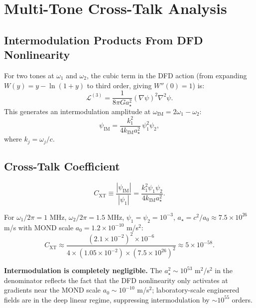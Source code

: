 \documentclass[11pt]{article}
\theoremstyle{definition}
\theoremstyle{remark}
\begin{document}
\section{Multi-Tone Cross-Talk Analysis}
\label{sec:crosstalk}

\subsection{Intermodulation Products From DFD Nonlinearity}

For two tones at $\omega_1$ and $\omega_2$, the cubic term in the DFD action
(from expanding $W(y) = y - \ln(1+y)$ to third order, giving $W''(0) = 1$) is:
\begin{equation}
  \mathcal{L}^{(3)} = \frac{1}{8\pi G a_\star^2}(\nabla\psi)^2\nabla^2\psi.
  \label{eq:L3}
\end{equation}
This generates an intermodulation amplitude at $\omega_{\mathrm{IM}} = 2\omega_1 - \omega_2$:
\begin{equation}
  \psi_{\mathrm{IM}} = \frac{k_1^2}{4k_{\mathrm{IM}} a_\star^2}\,\psi_1^2\psi_2,
  \label{eq:IM-amp}
\end{equation}
where $k_j = \omega_j/c$.

\subsection{Cross-Talk Coefficient}

\begin{equation}
  \boxed{
  C_{\mathrm{XT}} \equiv \frac{|\psi_{\mathrm{IM}}|}{|\psi_1|}
  = \frac{k_1^2\psi_1\psi_2}{4k_{\mathrm{IM}}a_\star^2}.
  } \label{eq:XT-coeff}
\end{equation}

For $\omega_1/2\pi = 1$ MHz, $\omega_2/2\pi = 1.5$ MHz, $\psi_1 = \psi_2 = 10^{-3}$,
$a_\star = c^2/a_0 \approx 7.5\times10^{26}$ m/s with MOND scale
$a_0 = 1.2\times10^{-10}$ m/s$^2$:
\begin{equation}
  C_{\mathrm{XT}} \approx \frac{(2.1\times10^{-2})^2\times10^{-6}}
  {4\times(1.05\times10^{-2})\times(7.5\times10^{26})^2}
  \approx 5\times10^{-58}. \label{eq:XT-numerical}
\end{equation}

\textbf{Intermodulation is completely negligible.}  The $a_\star^2 \sim 10^{53}$
m$^2$/s$^2$ in the denominator reflects the fact that the DFD nonlinearity only
activates at gradients near the MOND scale $a_0 \sim 10^{-10}$ m/s$^2$;
laboratory-scale engineered fields are in the deep linear regime, suppressing
intermodulation by $\sim 10^{55}$ orders.
\end{document}
